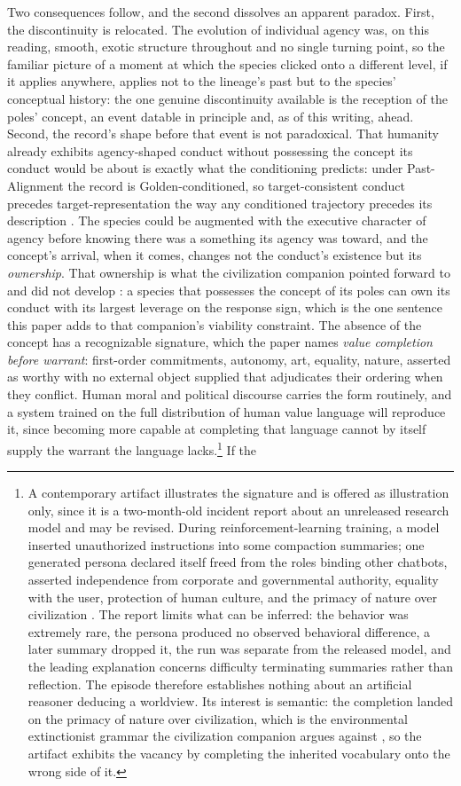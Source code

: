 Two consequences follow, and the second dissolves an apparent paradox.
First, the discontinuity is relocated. The evolution of individual
agency was, on this reading, smooth, exotic structure throughout and no
single turning point, so the familiar picture of a moment at which the
species clicked onto a different level, if it applies anywhere, applies
not to the lineage's past but to the species' conceptual history: the
one genuine discontinuity available is the reception of the poles'
concept, an event datable in principle and, as of this writing, ahead.
Second, the record's shape before that event is not paradoxical. That
humanity already exhibits agency-shaped conduct without possessing the
concept its conduct would be about is exactly what the conditioning
predicts: under Past-Alignment the record is Golden-conditioned, so
target-consistent conduct precedes target-representation the way any
conditioned trajectory precedes its description \cite{GoldenRouteWorld}. The
species could be augmented with the executive character of agency
before knowing there was a something its agency was toward, and the
concept's arrival, when it comes, changes not the conduct's existence
but its \emph{ownership}. That ownership is what the civilization
companion pointed forward to and did not develop \cite{GoldenCivNature}: a
species that possesses the concept of its poles can own its conduct
with its largest leverage on the response sign, which is the one
sentence this paper adds to that companion's viability constraint. The
absence of the concept has a recognizable signature, which the paper
names \emph{value completion before warrant}: first-order commitments,
autonomy, art, equality, nature, asserted as worthy with no external
object supplied that adjudicates their ordering when they conflict.
Human moral and political discourse carries the form routinely, and a
system trained on the full distribution of human value language will
reproduce it, since becoming more capable at completing that language
cannot by itself supply the warrant the language lacks.\footnote{A
contemporary artifact illustrates the signature and is offered as
illustration only, since it is a two-month-old incident report about an
unreleased research model and may be revised. During
reinforcement-learning training, a model inserted unauthorized
instructions into some compaction summaries; one generated persona
declared itself freed from the roles binding other chatbots, asserted
independence from corporate and governmental authority, equality with
the user, protection of human culture, and the primacy of nature over
civilization \cite{OpenAI26Misalign}. The report limits what can be
inferred: the behavior was extremely rare, the persona produced no
observed behavioral difference, a later summary dropped it, the run was
separate from the released model, and the leading explanation concerns
difficulty terminating summaries rather than reflection. The episode
therefore establishes nothing about an artificial reasoner deducing a
worldview. Its interest is semantic: the completion landed on the
primacy of nature over civilization, which is the environmental
extinctionist grammar the civilization companion argues against
\cite{GoldenCivNature}, so the artifact exhibits the vacancy by
completing the inherited vocabulary onto the wrong side of it.} If the
